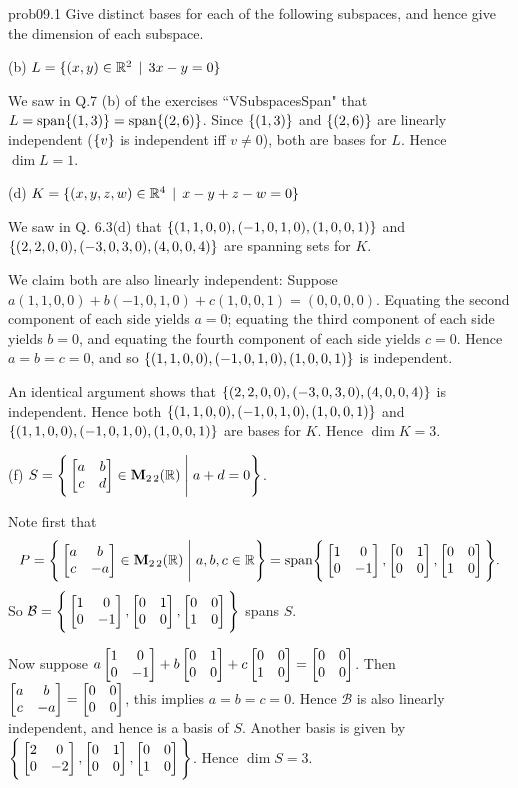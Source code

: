 
\begin{sol}{prob09.1} Give  distinct bases for each of the following subspaces, and hence give the dimension of each subspace.
\medskip

(b)  $L=\{(x, y) \in \mathbb{R}^2\,\mid \, 3x - y=0  \}$

\soln We saw in Q.7 (b) of the exercises ``VSubspacesSpan" that $L=\textrm{span}\{(1,3)\}=\textrm{span}\{(2,6)\}$. Since $\{(1,3) \}$ and $\{(2,6) \}$ are linearly independent ($\{v \}$ is independent iff $v \not=0$), both are bases for $L$. Hence $\dim L=1$.\medskip
%


 

(d)  $K=\{(x, y, z, w) \in \mathbb{R}^4\,\mid \, x-y+z-w=0  \}$ 

\soln  We saw in Q. 6.3(d)  that
$\{(1,1,0,0),(-1, 0,1,0),(1,0,0,1)  \}$  and $\{(2,2,0,0),(-3, 0,3,0),(4,0,0,4)  \}$ are spanning sets for $K$. 

We claim both are also linearly independent: Suppose $a(1,1,0,0)+b(-1, 0,1,0)+c(1,0,0,1)=(0,0,0,0)$. Equating the second component of each side yields $a=0$; equating the third component of each side yields $b=0$, and equating  the fourth component of each side yields $c=0$. Hence $a=b=c=0$, and so $\{(1,1,0,0),(-1, 0,1,0),(1,0,0,1)  \}$ is independent.

 An identical argument shows that $\{(2,2,0,0),(-3, 0,3,0),(4,0,0,4)  \}$ is independent. Hence both $\{(1,1,0,0),(-1, 0,1,0),(1,0,0,1)  \}$ and $\{(1,1,0,0),(-1, 0,1,0),(1,0,0,1)  \}$ are bases for $K$. Hence $\dim K=3$.

\medskip
%
(f)  $S=\Bigg\{  \bmatrix a&b\\ c&d\endbmatrix \in \M_{2 \,2}(\R) \;\Bigg|\; a+d=0\Bigg\}$. 

\soln
Note first that $$P=\Bigg\{  \bmatrix a&b\\ c&-a\endbmatrix \in \M_{2 \,2}(\R) \;\Bigg|\; a,b,c\in \R\Bigg\}=\text{span}\Bigg\{ \bmatrix 1&0\\ 0&-1\endbmatrix,\bmatrix 0&1\\ 0&0\endbmatrix,\bmatrix 0&0\\ 1&0\endbmatrix \Bigg\}.$$ So $\mathcal B=\Bigg\{ \bmatrix 1&0\\ 0&-1\endbmatrix,\bmatrix 0&1\\ 0&0\endbmatrix,\bmatrix 0&0\\ 1&0\endbmatrix \Bigg\}$ spans $S$.

Now suppose $a \bmatrix 1&0\\ 0&-1\endbmatrix+ b \bmatrix 0&1\\ 0&0\endbmatrix +c\bmatrix 0&0\\ 1&0\endbmatrix =\bmatrix 0&0\\ 0&0\endbmatrix$. Then $\bmatrix a&b\\ c&-a\endbmatrix=\bmatrix 0&0\\ 0&0\endbmatrix$, this implies $a=b=c=0$. Hence $\mathcal B$ is also linearly independent, and hence is a basis of $S$. Another basis is given by  $\Bigg\{ \bmatrix 2&0\\ 0&-2\endbmatrix,\bmatrix 0&1\\ 0&0\endbmatrix,\bmatrix 0&0\\ 1&0\endbmatrix \Bigg\}$. Hence $\dim S=3$.
\medskip
%


\end{sol}
